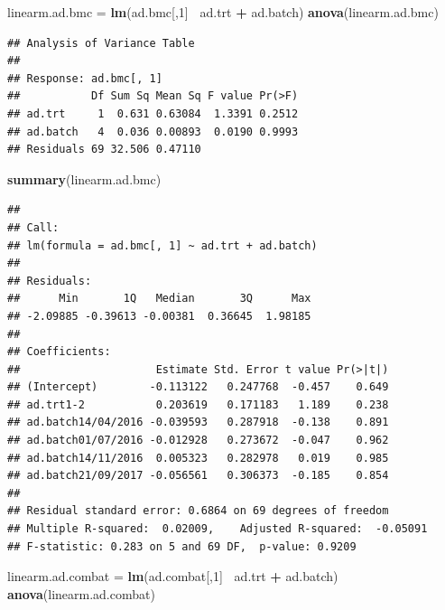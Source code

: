 \documentclass[]{book}
\newenvironment{Shaded}{\begin{snugshade}}{\end{snugshade}}
\newcommand{\KeywordTok}[1]{\textcolor[rgb]{0.13,0.29,0.53}{\textbf{#1}}}
\newcommand{\DecValTok}[1]{\textcolor[rgb]{0.00,0.00,0.81}{#1}}
\newcommand{\StringTok}[1]{\textcolor[rgb]{0.31,0.60,0.02}{#1}}
\newcommand{\OperatorTok}[1]{\textcolor[rgb]{0.81,0.36,0.00}{\textbf{#1}}}
\newcommand{\NormalTok}[1]{#1}
\begin{document}
\begin{Shaded}
\begin{Highlighting}[]
\NormalTok{linearm.ad.bmc =}\StringTok{ }\KeywordTok{lm}\NormalTok{(ad.bmc[,}\DecValTok{1}\NormalTok{]}\OperatorTok{~}\StringTok{ }\NormalTok{ad.trt }\OperatorTok{+}\StringTok{ }\NormalTok{ad.batch)}
\KeywordTok{anova}\NormalTok{(linearm.ad.bmc)}
\end{Highlighting}
\end{Shaded}

\begin{verbatim}
## Analysis of Variance Table
## 
## Response: ad.bmc[, 1]
##           Df Sum Sq Mean Sq F value Pr(>F)
## ad.trt     1  0.631 0.63084  1.3391 0.2512
## ad.batch   4  0.036 0.00893  0.0190 0.9993
## Residuals 69 32.506 0.47110
\end{verbatim}

\begin{Shaded}
\begin{Highlighting}[]
\KeywordTok{summary}\NormalTok{(linearm.ad.bmc)}
\end{Highlighting}
\end{Shaded}

\begin{verbatim}
## 
## Call:
## lm(formula = ad.bmc[, 1] ~ ad.trt + ad.batch)
## 
## Residuals:
##      Min       1Q   Median       3Q      Max 
## -2.09885 -0.39613 -0.00381  0.36645  1.98185 
## 
## Coefficients:
##                     Estimate Std. Error t value Pr(>|t|)
## (Intercept)        -0.113122   0.247768  -0.457    0.649
## ad.trt1-2           0.203619   0.171183   1.189    0.238
## ad.batch14/04/2016 -0.039593   0.287918  -0.138    0.891
## ad.batch01/07/2016 -0.012928   0.273672  -0.047    0.962
## ad.batch14/11/2016  0.005323   0.282978   0.019    0.985
## ad.batch21/09/2017 -0.056561   0.306373  -0.185    0.854
## 
## Residual standard error: 0.6864 on 69 degrees of freedom
## Multiple R-squared:  0.02009,    Adjusted R-squared:  -0.05091 
## F-statistic: 0.283 on 5 and 69 DF,  p-value: 0.9209
\end{verbatim}

\begin{Shaded}
\begin{Highlighting}[]
\NormalTok{linearm.ad.combat =}\StringTok{ }\KeywordTok{lm}\NormalTok{(ad.combat[,}\DecValTok{1}\NormalTok{]}\OperatorTok{~}\StringTok{ }\NormalTok{ad.trt }\OperatorTok{+}\StringTok{ }\NormalTok{ad.batch)}
\KeywordTok{anova}\NormalTok{(linearm.ad.combat)}
\end{Highlighting}
\end{Shaded}
\end{document}
